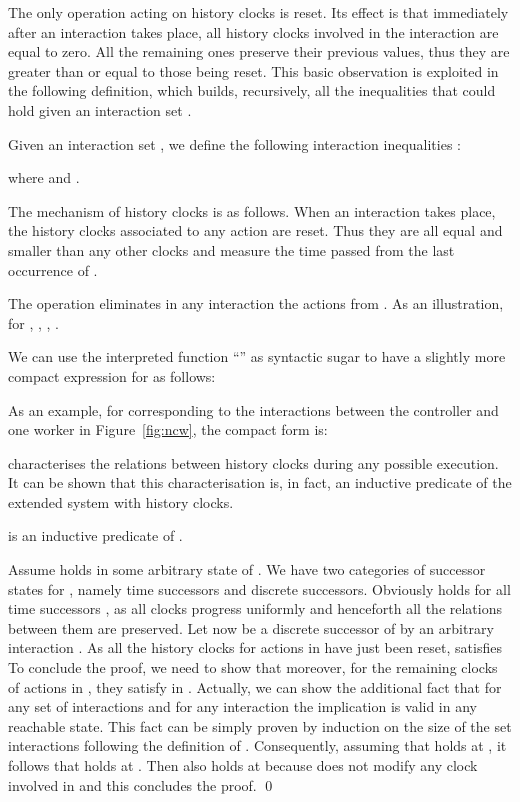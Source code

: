 \documentclass{LMCS}
\theoremstyle{plain}\newtheorem{remark}[thm]{Remark}
\theoremstyle{plain}\newtheorem{example}[thm]{Example}
\begin{document}
The only operation acting on history clocks is reset. Its effect is
that immediately after an interaction takes place, all history clocks
involved in the interaction are equal to zero. All the remaining ones
preserve their previous values, thus they are greater than or equal to
those being reset. This basic observation is exploited in the
following definition, which builds, recursively, all the inequalities
that could hold given an interaction set .

\begin{defi}
\label{def:eqs}
Given an interaction set , we define the following
interaction inequalities :

where  and .
\end{defi}

The mechanism of history clocks is as follows. When an interaction
 takes place, the history clocks  associated to any
action  are reset. Thus they are all equal and smaller
than any other clocks and measure the time passed from the last
occurrence of .

The operation  eliminates in any interaction
 the actions from . As an illustration, for , , , . 



We can use the interpreted function ``'' as syntactic sugar to have a
slightly more compact expression for  as follows:
 
As an example, for  corresponding to
the interactions between the controller and one worker in
Figure~\ref{fig:ncw}, the compact form is:


\noindent  characterises the relations between history clocks during
any possible execution. It can be shown that this characterisation is, in
fact, an inductive predicate of the extended system with history clocks.

\begin{prop}
\label{p:eqsI}
 is an inductive predicate of .
\end{prop}
\proof Assume  holds in some arbitrary state  of
. We have two categories of successor states for
, namely time successors and discrete successors. Obviously
 holds for all time successors , as all clocks
progress uniformly and henceforth all the relations between them are
preserved.  Let now  be a discrete successor of  by an
arbitrary interaction .  As all the history clocks for actions
in  have just been reset,  satisfies
 To conclude the proof, we need to show that moreover, for
the remaining clocks of actions in ,
they satisfy  in .  Actually, we can
show the additional fact that for any set of interactions  and
for any interaction  the implication  is valid in any reachable state. This
fact can be simply proven by induction on the size of the set
interactions  following the definition of
. Consequently, assuming that  holds at , it
follows that  holds at . Then
 also holds at  because  does
not modify any clock involved in  and this
concludes the proof.  \qed
\end{document}
